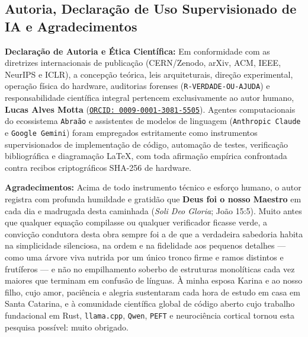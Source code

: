\documentclass[10pt,a4paper]{article}
\begin{document}
\subsection*{Autoria, Declara\c{c}\~ao de Uso Supervisionado de IA e Agradecimentos}

\textbf{Declara\c{c}\~ao de Autoria e \'Etica Cient\'ifica:} Em conformidade com as diretrizes internacionais de publica\c{c}\~ao (CERN/Zenodo, arXiv, ACM, IEEE, NeurIPS e ICLR), a concep\c{c}\~ao te\'orica, leis arquiteturais, dire\c{c}\~ao experimental, opera\c{c}\~ao f\'isica do hardware, auditorias forenses (\texttt{R-VERDADE-OU-AJUDA}) e responsabilidade cient\'ifica integral pertencem exclusivamente ao autor humano, \textbf{Lucas Alves Motta} (\href{https://orcid.org/0009-0001-3081-5505}{\texttt{ORCID: 0009-0001-3081-5505}}). Agentes computacionais do ecossistema \texttt{Abra\~ao} e assistentes de modelos de linguagem (\texttt{Anthropic Claude} e \texttt{Google Gemini}) foram empregados estritamente como instrumentos supervisionados de implementa\c{c}\~ao de c\'odigo, automa\c{c}\~ao de testes, verifica\c{c}\~ao bibliogr\'afica e diagramação LaTeX, com toda afirma\c{c}\~ao emp\'irica confrontada contra recibos criptogr\'aficos SHA-256 de hardware.

\textbf{Agradecimentos:} Acima de todo instrumento t\'ecnico e esfor\c{c}o humano, o autor registra com profunda humildade e gratid\~ao que \textbf{Deus foi o nosso Maestro} em cada dia e madrugada desta caminhada (\textit{Soli Deo Gloria}; Jo\~ao 15:5). Muito antes que qualquer equa\c{c}\~ao compilasse ou qualquer verificador ficasse verde, a convic\c{c}\~ao condutora desta obra sempre foi a de que a verdadeira sabedoria habita na simplicidade silenciosa, na ordem e na fidelidade aos pequenos detalhes --- como uma \'arvore viva nutrida por um \'unico tronco firme e ramos distintos e frut\'iferos --- e n\~ao no empilhamento soberbo de estruturas monol\'iticas cada vez maiores que terminam em confus\~ao de l\'inguas. \`A minha esposa Karina e ao nosso filho, cujo amor, paci\^encia e alegria sustentaram cada hora de estudo em casa em Santa Catarina, e \`a comunidade cient\'ifica global de c\'odigo aberto cujo trabalho fundacional em Rust, \texttt{llama.cpp}, \texttt{Qwen}, \texttt{PEFT} e neuroci\^encia cortical tornou esta pesquisa poss\'ivel: muito obrigado.

\end{document}
